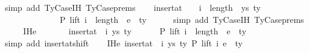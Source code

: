 \begin{isabellebody}
\ {\isacharparenleft}{\kern0pt}simp\ add{\isacharcolon}{\kern0pt}\ TyCase{\isachardot}{\kern0pt}IH{\isacharparenleft}{\kern0pt}{}{\isacharparenright}{\kern0pt}\ TyCase{\isachardot}{\kern0pt}prems{\isacharparenright}{\kern0pt}\isanewline
\isanewline
\ \ \isamarkupfalse%
\ {\isachardoublequoteopen}insert{\isacharunderscore}{\kern0pt}at\ {\isacharparenleft}{\kern0pt}{\isasymGamma}{}\ {\isacharat}{\kern0pt}\ {\isasymGamma}{\isacharparenright}{\kern0pt}\ {\isacharparenleft}{\kern0pt}i\ {\isacharplus}{\kern0pt}\ length\ {\isasymGamma}{}{\isacharparenright}{\kern0pt}\ {\isacharparenleft}{\kern0pt}ys{\isacharcomma}{\kern0pt}\ ty{}{\isacharparenright}{\kern0pt}\isanewline
\ \ \ \ \ \ \ \ \ \ \ \ \ \ {\isasymturnstile}{\isacharbraceleft}{\kern0pt}P{\isacharbraceright}{\kern0pt}\ lift\ {\isacharparenleft}{\kern0pt}i\ {\isacharplus}{\kern0pt}\ length\ {\isasymGamma}{}{\isacharparenright}{\kern0pt}\ e{}\ {\isacharcolon}{\kern0pt}\ ty{}{\isacharprime}{\kern0pt}{\isachardoublequoteclose}\isanewline
\ \ \ \ \isamarkupfalse%
\ {\isacharparenleft}{\kern0pt}simp\ add{\isacharcolon}{\kern0pt}\ TyCase{\isachardot}{\kern0pt}IH{\isacharparenleft}{\kern0pt}{}{\isacharparenright}{\kern0pt}\ TyCase{\isachardot}{\kern0pt}prems{\isacharparenright}{\kern0pt}\isanewline
\ \ \isamarkupfalse%
\ \isamarkupfalse%
\ IHe{}{\isacharcolon}{\kern0pt}\isanewline
\ \ \ \ \ {\isachardoublequoteopen}{\isasymGamma}{}\ {\isacharat}{\kern0pt}\ insert{\isacharunderscore}{\kern0pt}at\ {\isasymGamma}\ i\ {\isacharparenleft}{\kern0pt}ys{\isacharcomma}{\kern0pt}\ ty{}{\isacharparenright}{\kern0pt}\isanewline
\ \ \ \ \ \ {\isasymturnstile}{\isacharbraceleft}{\kern0pt}P{\isacharbraceright}{\kern0pt}\ lift\ {\isacharparenleft}{\kern0pt}i\ {\isacharplus}{\kern0pt}\ length\ {\isasymGamma}{}{\isacharparenright}{\kern0pt}\ e{}\ {\isacharcolon}{\kern0pt}\ ty{}{\isacharprime}{\kern0pt}{\isachardoublequoteclose}\isanewline
\ \ \ \ \isamarkupfalse%
\ {\isacharparenleft}{\kern0pt}simp\ add{\isacharcolon}{\kern0pt}\ insert{\isacharunderscore}{\kern0pt}at{\isacharunderscore}{\kern0pt}shift{\isacharparenright}{\kern0pt}\isanewline
\isanewline
\ \ \isamarkupfalse%
\ IHe{}{\isacharcolon}{\kern0pt}\ {\isachardoublequoteopen}insert{\isacharunderscore}{\kern0pt}at\ {\isasymGamma}\ i\ {\isacharparenleft}{\kern0pt}ys{\isacharcomma}{\kern0pt}\ ty{}{\isacharparenright}{\kern0pt}\ {\isasymturnstile}{\isacharbraceleft}{\kern0pt}P{\isacharbraceright}{\kern0pt}\ lift\ i\ e{}\ {\isacharcolon}{\kern0pt}\ ty{}{\isacharprime}{\kern0pt}{\isachardoublequoteclose}\isanewline

\end{isabellebody}
